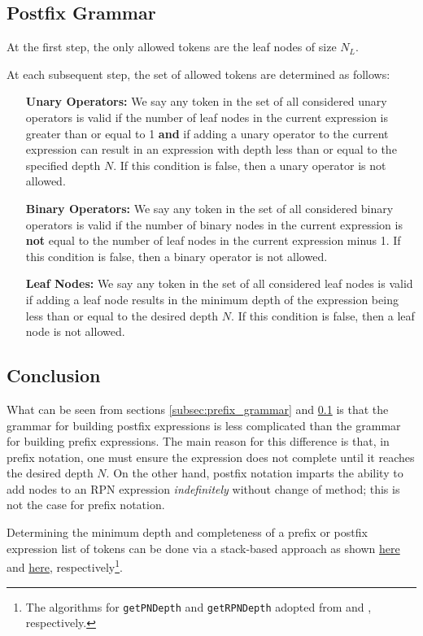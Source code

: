 \documentclass[runningheads]{llncs}
\begin{document}
\subsection{Postfix Grammar}\label{subsec:postfix_grammar}
At the first step, the only allowed tokens are the leaf nodes of size $N_L$.
\par At each subsequent step, the set of allowed tokens are determined as follows:
\begin{itemize}
\item[\textbf{Unary Operators:}]
We say any token in the set of all considered unary operators is valid if the number of leaf nodes in the current expression is greater than or equal to 1 \textbf{and} if adding a unary operator to the current expression can result in an expression with depth less than or equal to the specified depth $N$. If this condition is false, then a unary operator is not allowed.
\item[\textbf{Binary Operators:}]
We say any token in the set of all considered binary operators is valid if the number of binary nodes in the current expression is \textbf{not} equal to the number of leaf nodes in the current expression minus 1. If this condition is false, then a binary operator is not allowed.
\item[\textbf{Leaf Nodes:}]
We say any token in the set of all considered leaf nodes is valid if adding a leaf node results in the minimum depth of the expression being less than or equal to the desired depth $N$. If this condition is false, then a leaf node is not allowed.
\end{itemize}

\subsection{Conclusion}
What can be seen from sections \ref{subsec:prefix_grammar} and \ref{subsec:postfix_grammar} is that the grammar for building postfix expressions is less complicated than the grammar for building prefix expressions. The main reason for this difference is that, in prefix notation, one must ensure the expression does not complete until it reaches the desired depth $N$. On the other hand, postfix notation imparts the ability to add nodes to an RPN expression \emph{indefinitely} without change of method; this is not the case for prefix notation. \par Determining the minimum depth and completeness of a prefix or postfix expression list of tokens can be done via a stack-based approach as shown \href{https://github.com/edfink234/Alpha-Zero-Symbolic-Regression/blob/0b5b6d0b56c2d108dda023a337edeb1084436da7/PrefixPostfixSR.cpp#L393-L485}{here} and \href{https://github.com/edfink234/Alpha-Zero-Symbolic-Regression/blob/0b5b6d0b56c2d108dda023a337edeb1084436da7/PrefixPostfixSR.cpp#L487-L641}{here}, respectively\footnote{The algorithms for \texttt{getPNDepth} and \texttt{getRPNDepth} adopted from \cite{77180279} and \cite{77128902}, respectively.}.
\end{document}
